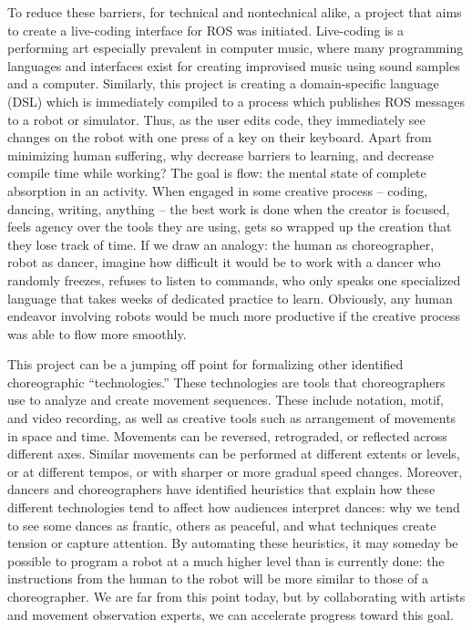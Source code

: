 \documentclass[arts,article,submit,moreauthors,pdftex,10pt,a4paper]{mdpi}
\begin{document}
To reduce these barriers, for technical and nontechnical alike, a project that
aims to create a live-coding interface for ROS was initiated. Live-coding is a
performing art especially prevalent in computer music, where many programming
languages and interfaces exist for creating improvised music using sound samples
and a computer. Similarly, this project is creating a domain-specific language
(DSL) which is immediately compiled to a process which publishes ROS messages to
a robot or simulator. Thus, as the user edits code, they immediately see changes
on the robot with one press of a key on their keyboard. Apart from minimizing human suffering, why
decrease barriers to learning, and decrease compile time while working? The goal
is flow: the mental state of complete absorption in an activity. When engaged in
some creative process -- coding, dancing, writing, anything -- the best work is
done when the creator is focused, feels agency over the tools they are using,
gets so wrapped up the creation that they lose track of time. If we draw an
analogy: the human as choreographer, robot as dancer, imagine how difficult it
would be to work with a dancer who randomly freezes, refuses to listen to
commands, who only speaks one specialized language that takes weeks of dedicated
practice to learn. Obviously, any human endeavor involving robots would be much
more productive if the creative process was able to flow more smoothly.

This project can be a jumping off point for formalizing other identified
choreographic ``technologies.'' These technologies are tools that
choreographers use to analyze and create movement sequences. These include
notation, motif, and video recording, as well as creative tools such as
arrangement of movements in space and time. Movements can be reversed,
retrograded, or reflected across different axes. Similar movements can be
performed at different extents or levels, or at different tempos, or with
sharper or more gradual speed changes. Moreover, dancers and choreographers have
identified heuristics that explain how these different technologies tend to
affect how audiences interpret dances: why we tend to see some dances as
frantic, others as peaceful, and what techniques create tension or capture
attention. By automating these heuristics, it may someday be possible to program
a robot at a much higher level than is currently done: the instructions from the
human to the robot will be more similar to those of a choreographer. We are far
from this point today, but by collaborating with artists and movement
observation experts, we can accelerate progress toward this goal.
\end{document}
